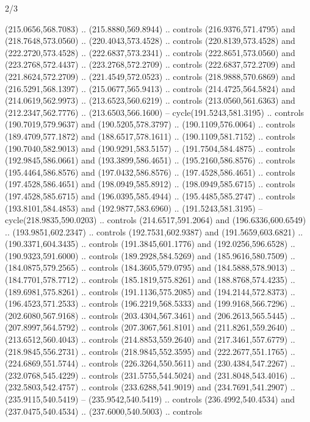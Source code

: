 \begin{flagdescription}{2/3}
\begin{scope}[xshift=0.5\flaglength,yshift=0.5\flagwidth,scale=\flagwidth/525.28]
\begin{scope}[y=0.1mm, x=0.1mm, yscale=-1,shift={(-381.5,-404)}]
\begin{scope}[shift={(5.25001,4.53053)},miter limit=4.00,line width=0.800\lw]
  (215.0656,568.7083) .. (215.8880,569.8944) .. controls (216.9376,571.4795) and
  (218.7648,573.0560) .. (220.4043,573.4528) .. controls (220.8139,573.4528) and
  (222.2720,573.4528) .. (222.6837,573.2341) .. controls (222.8651,573.0560) and
  (223.2768,572.4437) .. (223.2768,572.2709) .. controls (222.6837,572.2709) and
  (221.8624,572.2709) .. (221.4549,572.0523) .. controls (218.9888,570.6869) and
  (216.5291,568.1397) .. (215.0677,565.9413) .. controls (214.4725,564.5824) and
  (214.0619,562.9973) .. (213.6523,560.6219) .. controls (213.0560,561.6363) and
  (212.2347,562.7776) .. (213.6503,566.1600) -- cycle(191.5243,581.3195) ..
  controls (190.7019,579.9637) and (190.5205,578.3797) .. (190.1109,576.0064) ..
  controls (189.4709,577.1872) and (188.6517,578.1611) .. (190.1109,581.7152) ..
  controls (190.7040,582.9013) and (190.9291,583.5157) .. (191.7504,584.4875) ..
  controls (192.9845,586.0661) and (193.3899,586.4651) .. (195.2160,586.8576) ..
  controls (195.4464,586.8576) and (197.0432,586.8576) .. (197.4528,586.4651) ..
  controls (197.4528,586.4651) and (198.0949,585.8912) .. (198.0949,585.6715) ..
  controls (197.4528,585.6715) and (196.0395,585.4944) .. (195.4485,585.2747) ..
  controls (193.8101,584.4853) and (192.9877,583.6960) .. (191.5243,581.3195) --
  cycle(218.9835,590.0203) .. controls (214.6517,591.2064) and
  (196.6336,600.6549) .. (193.9851,602.2347) .. controls (192.7531,602.9387) and
  (191.5659,603.6821) .. (190.3371,604.3435) .. controls (191.3845,601.1776) and
  (192.0256,596.6528) .. (190.9323,591.6000) .. controls (189.2928,584.5269) and
  (185.9616,580.7509) .. (184.0875,579.2565) .. controls (184.3605,579.0795) and
  (184.5888,578.9013) .. (184.7701,578.7712) .. controls (185.1819,575.8261) and
  (188.8768,574.4235) .. (189.6981,575.8261) .. controls (191.1136,575.2085) and
  (194.2144,572.8373) .. (196.4523,571.2533) .. controls (196.2219,568.5333) and
  (199.9168,566.7296) .. (202.6080,567.9168) .. controls (203.4304,567.3461) and
  (206.2613,565.5445) .. (207.8997,564.5792) .. controls (207.3067,561.8101) and
  (211.8261,559.2640) .. (213.6512,560.4043) .. controls (214.8853,559.2640) and
  (217.3461,557.6779) .. (218.9845,556.2731) .. controls (218.9845,552.3595) and
  (222.2677,551.1765) .. (224.6869,551.5744) .. controls (226.3264,550.5611) and
  (230.4384,547.2267) .. (232.0768,545.4229) .. controls (231.5755,544.5024) and
  (231.8048,543.4016) .. (232.5803,542.4757) .. controls (233.6288,541.9019) and
  (234.7691,541.2907) .. (235.9115,540.5419) -- (235.9542,540.5419) .. controls
  (236.4992,540.4534) and (237.0475,540.4534) .. (237.6000,540.5003) .. controls

\end{scope}
\end{scope}
\end{scope}
\end{flagdescription}
